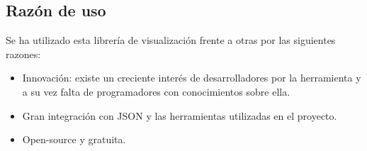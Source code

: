 \subsection{Razón de uso}
Se ha utilizado esta librería de visualización frente a otras por las siguientes razones:

\begin{itemize}
	\item Innovación: existe un creciente interés de desarrolladores por la herramienta y a su vez falta de programadores con conocimientos sobre ella.
	\item Gran integración con JSON y las herramientas utilizadas en el proyecto.
	\item Open-source y gratuita. 
\end{itemize}
